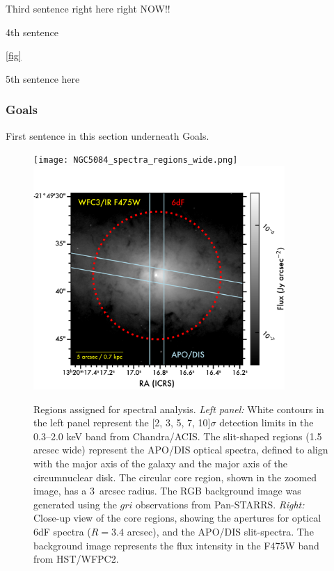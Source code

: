 \documentclass[modern]{CORE-AAS/aastex631}
\begin{document}
{\begin{center}
Third sentence right here right NOW!! 

\pam


4th sentence \citep{johnson2022}

\ref{fig}

5th sentence here 

\subsubsection{Goals}
\label{subsub:goals}
First sentence in this section underneath Goals. 

\begin{figure}[t!]
\begin{center}
\texttt{[image: NGC5084\_spectra\_regions\_wide.png]}\includegraphics[trim={0 0 0 0}, clip, height=8.5cm]{NGC5084_regions_core.png}
\caption{Regions assigned for spectral analysis. \emph{Left panel:} White contours in the left panel represent the [2, 3, 5, 7, 10]$\sigma$ detection limits in the 0.3--2.0 keV band from Chandra/ACIS. The slit-shaped regions (1.5 arcsec wide) represent the APO/DIS optical spectra, defined to align with the major axis of the galaxy and the major axis of the circumnuclear disk. The circular core region, shown in the zoomed image, has a 3~arcsec radius. The RGB background image was generated using the $gri$ observations from Pan-STARRS. \emph{Right:} Close-up view of the core regions, showing the apertures for optical 6dF spectra ($R=3.4$ arcsec), and the APO/DIS slit-spectra. The background image represents the flux intensity in the F475W band from HST/WFPC2.} 
\label{fig:NGC5084_spectra_regions}
\end{center}
\end{figure}


\end{center}}
\end{document}
